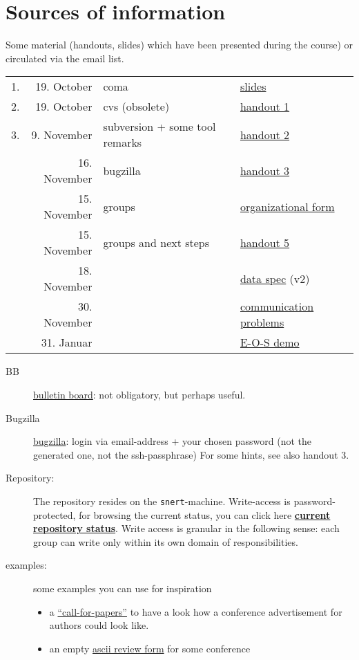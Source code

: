 
\section*{Sources of information}


Some material (handouts, slides) which have been presented during the
course) or circulated via the email list.



\begin{tabular}{r@{\quad\quad}rll}
  \hline
  1. & 19. October & coma  & 
  \href{slides/main-coma.pdf}{slides}
  \\
  2. & 19. October & cvs (obsolete) & \href{handouts/handout1.pdf}{handout 1}
  \\
  3. & 9. November & subversion + some tool remarks &
  \href{handouts/handout2.pdf}{handout 2}
  \\
   & 16. November & bugzilla &
  \href{handouts/handout3.pdf}{handout 3}
  \\
   & 15. November & groups &
  \href{handouts/handout4.pdf}{organizational form}
  \\
   & 15. November & groups and next steps &
  \href{handouts/handout5.pdf}{handout 5}
  \\\hline 
   & 18. November &  &
  \href{spec/v2/main.pdf}{data spec} (v2)
  \\\hline 
   & 30. November &  &
  \href{handouts/handout6.pdf}{communication problems}
  \\
   & 31. Januar &  &
  \href{handouts/handout7.pdf}{E-O-S demo}
  \\
\end{tabular}




\begin{description}
\item[BB]
  \href{http://snert.informatik.uni-kiel.de:8080/~swprakt/phpBB2/}{bulletin
    board}: not obligatory, but perhaps useful.
\item[Bugzilla] 
  \href{http://snert.informatik.uni-kiel.de:8080/~swprakt/bugzilla}{bugzilla}: 
  login via email-address + your chosen password (not the generated one, not the ssh-passphrase)
  For some hints, see also handout 3.
\item[Repository:] The repository resides on the \texttt{snert}-machine.
  Write-access is password-protected, for browsing the current status, you
  can click here
  \href{http://snert.informatik.uni-kiel.de:8080/svn/coma/}{\textbf{current
      repository status}}. Write access is granular in the following sense:
  each group can write only within its own domain of responsibilities.
\item[examples:] some examples you can use for inspiration
  \begin{itemize}
  \item a \href{requirements/examples/cfpapers.html}{ ``call-for-papers''}
    to have a look how a conference advertisement for authors could look
    like.
  \item an empty \href{requirements/examples/reviewform.txt}{ascii review
      form} for some conference
  \end{itemize}
\end{description}




